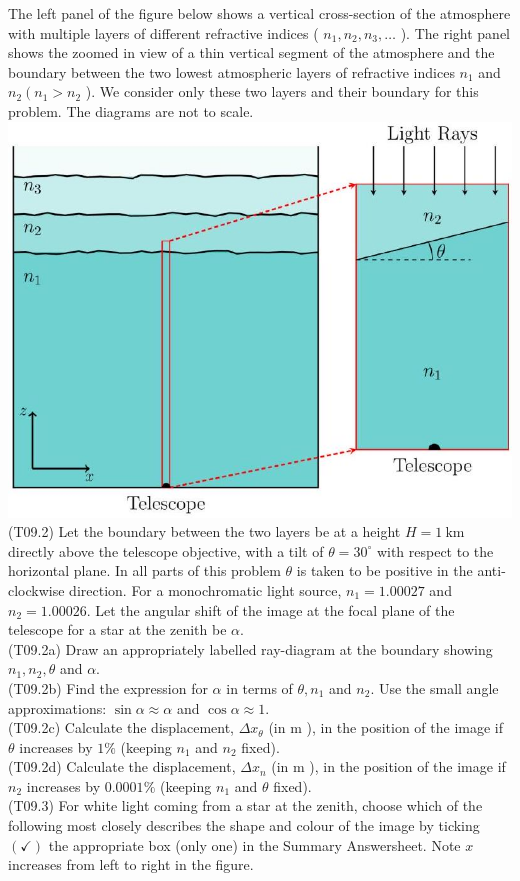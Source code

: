 \documentclass[10pt]{article}
\begin{document}
    The left panel of the figure below shows a vertical cross-section of the atmosphere with multiple layers of different refractive indices ( $n_{1}, n_{2}, n_{3}, \ldots$ ). The right panel shows the zoomed in view of a thin vertical segment of the atmosphere and the boundary between the two lowest atmospheric layers of refractive indices $n_{1}$ and $n_{2}\left(n_{1}>n_{2}\right.$ ). We consider only these two layers and their boundary for this problem. The diagrams are not to scale.\\
    \includegraphics[max width=\textwidth, center]{2025_08_23_e94579452776a99c4850g-09(1)}\\
    (T09.2) Let the boundary between the two layers be at a height $H=1 \mathrm{~km}$ directly above the telescope objective, with a tilt of $\theta=30^{\circ}$ with respect to the horizontal plane. In all parts of this problem $\theta$ is taken to be positive in the anti-clockwise direction. For a monochromatic light source, $n_{1}=1.00027$ and $n_{2}=1.00026$. Let the angular shift of the image at the focal plane of the telescope for a star at the zenith be $\alpha$.\\
    (T09.2a) Draw an appropriately labelled ray-diagram at the boundary showing $n_{1}, n_{2}, \theta$ and $\alpha$.\\
    (T09.2b) Find the expression for $\alpha$ in terms of $\theta, n_{1}$ and $n_{2}$. Use the small angle approximations: $\sin \alpha \approx \alpha$ and $\cos \alpha \approx 1$.\\
    (T09.2c) Calculate the displacement, $\Delta x_{\theta}$ (in m ), in the position of the image if $\theta$ increases by $1 \%$ (keeping $n_{1}$ and $n_{2}$ fixed).\\
    (T09.2d) Calculate the displacement, $\Delta x_{n}$ (in m ), in the position of the image if $n_{2}$ increases by $0.0001 \%$ (keeping $n_{1}$ and $\theta$ fixed).\\
    (T09.3) For white light coming from a star at the zenith, choose which of the following most closely describes the shape and colour of the image by ticking $(\checkmark)$ the appropriate box (only one) in the Summary Answersheet. Note $x$ increases from left to right in the figure.
    
\end{document}
